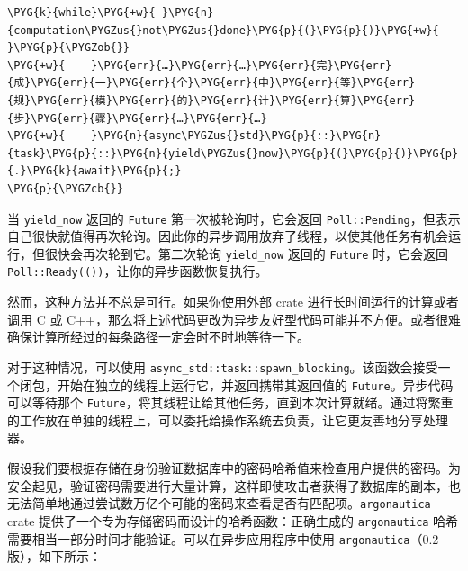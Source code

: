 \begin{Verbatim}[commandchars=\\\{\},breaklines=true,breakanywhere=true,fontsize=\codefont,xleftmargin=17bp]
\PYG{k}{while}\PYG{+w}{ }\PYG{n}{computation\PYGZus{}not\PYGZus{}done}\PYG{p}{(}\PYG{p}{)}\PYG{+w}{ }\PYG{p}{\PYGZob{}}
\PYG{+w}{    }\PYG{err}{…}\PYG{err}{…}\PYG{err}{完}\PYG{err}{成}\PYG{err}{一}\PYG{err}{个}\PYG{err}{中}\PYG{err}{等}\PYG{err}{规}\PYG{err}{模}\PYG{err}{的}\PYG{err}{计}\PYG{err}{算}\PYG{err}{步}\PYG{err}{骤}\PYG{err}{…}\PYG{err}{…}
\PYG{+w}{    }\PYG{n}{async\PYGZus{}std}\PYG{p}{::}\PYG{n}{task}\PYG{p}{::}\PYG{n}{yield\PYGZus{}now}\PYG{p}{(}\PYG{p}{)}\PYG{p}{.}\PYG{k}{await}\PYG{p}{;}
\PYG{p}{\PYGZcb{}}
\end{Verbatim}

当 \texttt{yield\_now} 返回的 \texttt{Future} 第一次被轮询时，它会返回 \texttt{Poll::Pending}，但表示自己很快就值得再次轮询。因此你的异步调用放弃了线程，以使其他任务有机会运行，但很快会再次轮到它。第二次轮询 \texttt{yield\_now} 返回的 \texttt{Future} 时，它会返回 \texttt{Poll::Ready(())}，让你的异步函数恢复执行。

然而，这种方法并不总是可行。如果你使用外部 crate 进行长时间运行的计算或者调用 C 或 C++，那么将上述代码更改为异步友好型代码可能并不方便。或者很难确保计算所经过的每条路径一定会时不时地等待一下。

对于这种情况，可以使用 \texttt{async\_std::task::spawn\_blocking}。该函数会接受一个闭包，开始在独立的线程上运行它，并返回携带其返回值的 \texttt{Future}。异步代码可以等待那个 \texttt{Future}，将其线程让给其他任务，直到本次计算就绪。通过将繁重的工作放在单独的线程上，可以委托给操作系统去负责，让它更友善地分享处理器。

假设我们要根据存储在身份验证数据库中的密码哈希值来检查用户提供的密码。为安全起见，验证密码需要进行大量计算，这样即使攻击者获得了数据库的副本，也无法简单地通过尝试数万亿个可能的密码来查看是否有匹配项。\texttt{argonautica} crate 提供了一个专为存储密码而设计的哈希函数：正确生成的 \texttt{argonautica} 哈希需要相当一部分时间才能验证。可以在异步应用程序中使用 \texttt{argonautica}（0.2 版），如下所示：

